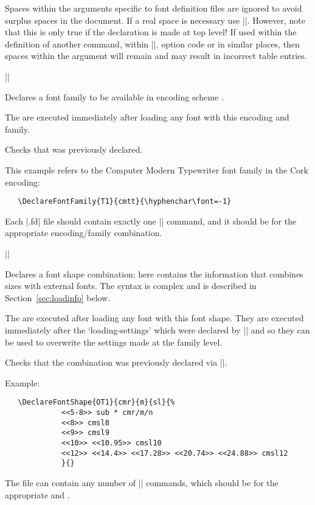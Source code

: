 \documentclass{ltxguide}[1995/11/28]
\begin{document}
Spaces within the arguments specific to font definition files are
ignored to avoid surplus spaces in the document. If a real space is
necessary use |\space|.
However, note that this is only true if the declaration is made at top
level! If used within the definition of another command, within
|\AtBeginDocument|, option code or in similar places, then spaces within
the argument will remain and may result in incorrect table entries.

\begin{decl}
  |\DeclareFontFamily|   
\end{decl}

Declares a font family  to be available in encoding scheme
.

The  are executed immediately after loading any font
with this encoding and family.

Checks that  was previously declared.

This example refers to the Computer Modern Typewriter font family in the
Cork encoding:
\begin{verbatim}
   \DeclareFontFamily{T1}{cmtt}{\hyphenchar\font=-1}
\end{verbatim}

Each |.fd| file should contain exactly one |\DeclareFontFamily| command,
and it should be for the appropriate encoding/family combination.

\begin{decl}
|\DeclareFontShape|   
                    \\
        \null\hfill {} 
\end{decl}

Declares a font shape combination; here  contains the
information that combines sizes with external fonts. The syntax is
complex and is described in Section~\ref{sec:loadinfo} below.

The  are executed after loading any font with this
font shape.  They are executed immediately after the `loading-settings'
which were declared by |\DeclareFontFamily| and so they can be used to
overwrite the settings made at the family level.

Checks that the combination  was previously
declared via |\DeclareFontFamily|.

Example:
\begin{verbatim}
   \DeclareFontShape{OT1}{cmr}{m}{sl}{%
             <<5-8>> sub * cmr/m/n
             <<8>> cmsl8
             <<9>> cmsl9
             <<10>> <<10.95>> cmsl10
             <<12>> <<14.4>> <<17.28>> <<20.74>> <<24.88>> cmsl12
             }{}
\end{verbatim}
The file can contain any number of |\DeclareFontShape| commands, which
should be for the appropriate  and .
\end{document}
